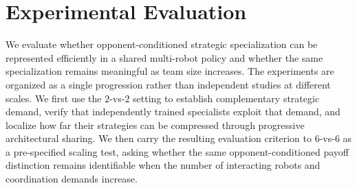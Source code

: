 %
%
\section{Experimental Evaluation}
\label{sec:exp}

We evaluate whether opponent-conditioned strategic specialization can be
represented efficiently in a shared multi-robot policy and whether the same
specialization remains meaningful as team size increases. The experiments are
organized as a single progression rather than independent studies at different
scales. We first use the $2$-vs-$2$ setting to establish complementary
strategic demand, verify that independently trained specialists exploit that
demand, and localize how far their strategies can be compressed through
progressive architectural sharing. We then carry the resulting evaluation
criterion to $6$-vs-$6$ as a pre-specified scaling test, asking whether the
same opponent-conditioned payoff distinction remains identifiable when the
number of interacting robots and coordination demands increase.

